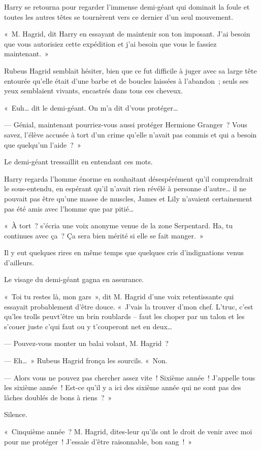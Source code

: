 Harry se retourna pour regarder l'immense demi-géant qui dominait la foule et toutes les autres têtes se tournèrent vers ce dernier d'un seul mouvement.

«~M. Hagrid, dit Harry en essayant de maintenir son ton imposant. J'ai besoin que vous autorisiez cette expédition et j'ai besoin que vous le fassiez maintenant.~»

Rubeus Hagrid semblait hésiter, bien que ce fut difficile à juger avec sa large tête entourée qu'elle était d'une barbe et de boucles laissées à l'abandon~; seuls ses yeux semblaient vivants, encastrés dans tous ces cheveux.

«~Euh… dit le demi-géant. On m'a dit d'vous protéger…

--- Génial, maintenant pourriez-vous aussi protéger Hermione Granger~? Vous savez, l'élève accusée à tort d'un crime qu'elle n'avait pas commis et qui a besoin que quelqu'un l'aide~?~»

Le demi-géant tressaillit en entendant ces mots.

Harry regarda l'homme énorme en souhaitant désespérément qu'il comprendrait le sous-entendu, en espérant qu'il n'avait rien révélé à personne d'autre… il ne pouvait pas être qu'une masse de muscles, James et Lily n'avaient certainement pas été amis avec l'homme que par pitié…

«~À tort~? s'écria une voix anonyme venue de la zone Serpentard. Ha, tu continues avec ça~? Ça sera bien mérité si elle se fait manger.~»

Il y eut quelques rires en même temps que quelques cris d'indignations venus d'ailleurs.

Le visage du demi-géant gagna en assurance.

«~Toi tu restes là, mon gars~», dit M. Hagrid d'une voix retentissante qui essayait probablement d'être douce. «~J'vais la trouver d'mon chef. L'truc, c'est qu'les trolls peuvt'être un brin roublards -- faut les choper par un talon et les s'couer juste c'qui faut ou y t'couperont net en deux…

--- Pouvez-vous monter un balai volant, M. Hagrid~?

--- Eh…~» Rubeus Hagrid fronça les sourcils. «~Non.

--- Alors vous ne pouvez pas chercher assez vite~! Sixième année~! J'appelle tous les sixième année~! Est-ce qu'il y a ici des sixième année qui ne sont pas des lâches doublés de bons à riens~?~»

Silence.

«~Cinquième année~? M. Hagrid, dites-leur qu'ils ont le droit de venir avec moi pour me protéger~! J'essaie d'être raisonnable, bon sang~!~»

